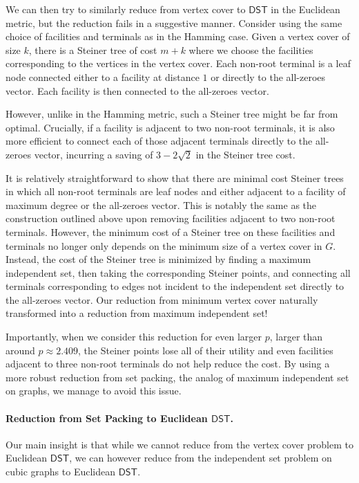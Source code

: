 \documentclass{article}\providecommand{\DeclareRedundantLanguages}[2]{}\usepackage[a4paper,margin=20mm]{geometry}
\newcommand{\1}{\textbf{1}}
\newcommand{\dst}{$\mathsf{DST}$\xspace}
\begin{document}
We can then try to similarly reduce from vertex cover to \dst in the Euclidean metric, but the reduction fails in a suggestive manner. Consider using the same choice of facilities and terminals as in the Hamming case. Given a vertex cover of size $k$, there is a Steiner tree of cost $m + k$ where we choose the facilities corresponding to the vertices in the vertex cover. Each non-root terminal is a leaf node connected either to a facility at distance $1$ or directly to the all-zeroes vector. Each facility is then connected to the all-zeroes vector. 

However, unlike in the Hamming metric, such a Steiner tree might be far from optimal. Crucially, if a facility is adjacent to two non-root terminals, it is also more efficient to connect each of those adjacent terminals directly to the all-zeroes vector, incurring a saving of $3 - 2\sqrt{2}$ in the Steiner tree cost. 

It is relatively straightforward to show that there are minimal cost Steiner trees in which all non-root terminals are leaf nodes and either adjacent to a facility of maximum degree or the all-zeroes vector. This is notably the same as the construction outlined above upon removing facilities adjacent to two non-root terminals. However, the minimum cost of a Steiner tree on these facilities and terminals no longer only depends on the minimum size of a vertex cover in $G$. Instead, the cost of the Steiner tree is minimized by finding a maximum independent set, then taking the corresponding Steiner points, and connecting all terminals corresponding to edges not incident to the independent set directly to the all-zeroes vector. Our reduction from minimum vertex cover naturally transformed into a reduction from maximum independent set!

Importantly, when we consider this reduction for even larger $p$, larger than around $p \approx 2.409$, the Steiner points lose all of their utility and even facilities adjacent to three non-root terminals do not help reduce the cost. By using a more robust reduction from set packing, the analog of maximum independent set on graphs, we manage to avoid this issue.

\paragraph{\texorpdfstring{Reduction from Set Packing to Euclidean \dst.}{Reduction from Set Packing to Euclidean DST.}}
Our main insight is that while we cannot reduce from the vertex cover problem to Euclidean \dst, we can however reduce from the independent set problem on cubic graphs to Euclidean \dst.
\end{document}
